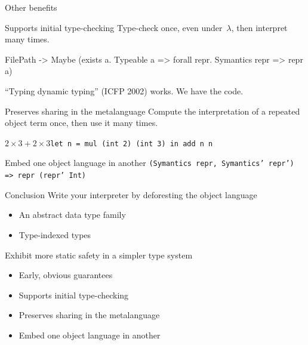 \documentclass[ucs,professionalfont]{beamer}
\begin{document}
\begin{frame}[fragile]{Other benefits}
\begin{block}{Supports initial type-checking}
    Type-check once, even under~$\lambda$, then interpret many times.

\begin{semiverbatim}
  FilePath -> \alert{Maybe} (exists a. Typeable a =>
                     forall repr. Symantics repr =>
                     repr a)
\end{semiverbatim}

    ``Typing dynamic typing'' (ICFP 2002) works.  We have the code.
\end{block}

\pause
\begin{block}{Preserves sharing in the metalanguage}
    Compute the interpretation of a repeated object term once, then use it many
    times.

    \smallskip
    $2\times3 + 2\times3$\hfill\texttt{let n = mul (int 2) (int 3) in add n n}
\end{block}

\pause
\begin{block}{Embed one object language in another}
\texttt{(Symantics repr, Symantics' repr') => repr (repr' Int)}\hspace*{-1em}
\end{block}
\end{frame}

\begin{frame}{Conclusion}
    Write your interpreter by deforesting the object language
    \begin{itemize}
    \item An abstract data type family
    \item Type-indexed types
    \end{itemize}
    Exhibit more static safety in a simpler type system
    \begin{itemize}
    \item Early, obvious guarantees
    \item Supports initial type-checking
    \item Preserves sharing in the metalanguage
    \item Embed one object language in another
    \end{itemize}
\end{frame}
\end{document}
